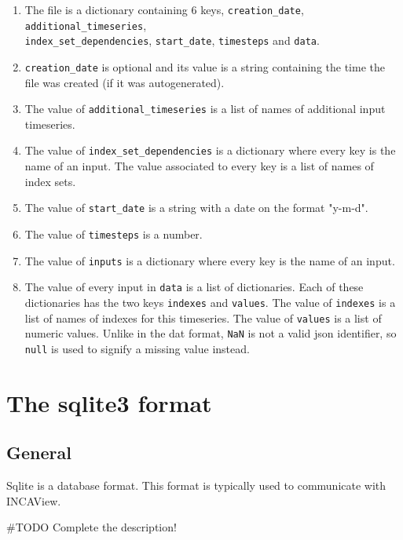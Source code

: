 \documentclass[11pt]{article}
\theoremstyle{definition}
\begin{document}
\begin{enumerate}[i]
\item The file is a dictionary containing 6 keys, {\tt creation\_date}, {\tt additional\_timeseries}, \\{\tt index\_set\_dependencies}, {\tt start\_date}, {\tt timesteps} and {\tt data}.
\item {\tt creation\_date} is optional and its value is a string containing the time the file was created (if it was autogenerated).
\item The value of {\tt additional\_timeseries} is a list of names of additional input timeseries.
\item The value of {\tt index\_set\_dependencies} is a dictionary where every key is the name of an input. The value associated to every key is a list of names of index sets.
\item The value of {\tt start\_date} is a string with a date on the format "y-m-d".
\item The value of {\tt timesteps} is a number.
\item The value of {\tt inputs} is a dictionary where every key is the name of an input.
\item The value of every input in {\tt data} is a list of dictionaries. Each of these dictionaries has the two keys {\tt indexes} and {\tt values}. The value of {\tt indexes} is a list of names of indexes for this timeseries. The value of {\tt values} is a list of numeric values. Unlike in the dat format, {\tt NaN} is not a valid json identifier, so {\tt null} is used to signify a missing value instead.
\end{enumerate}

\section{The sqlite3 format}

\subsection{General}

Sqlite is a database format. This format is typically used to communicate with INCAView.

\#TODO Complete the description!



\end{document}
